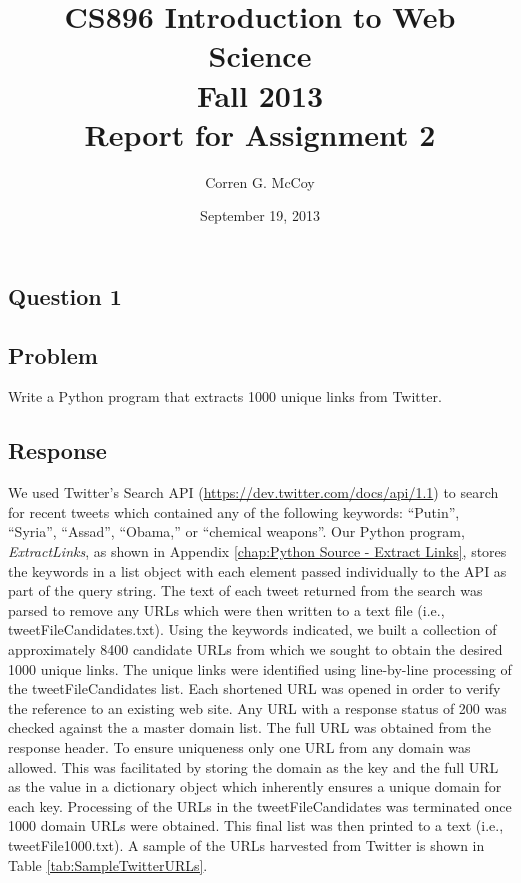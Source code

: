 \documentclass[letterpaper,11pt]{report}
\begin{document}
 
\begin{savenotes}
\pagestyle{plain}
\title{CS896 Introduction to Web Science\\Fall 2013\\Report for Assignment 2}
\author{Corren G. McCoy}
 
\date{September 19, 2013}
\maketitle

\renewcommand*\thesection{\arabic{section}}
\setcounter{section}{0}

\setcounter{tocdepth}{4}
\tableofcontents
 \listoffigures
 \listoftables
\newpage


\section{Question 1}
\subsection{Problem}Write a Python program that extracts 1000 unique links from Twitter.
\subsection{Response}We used Twitter's Search API (\url{https://dev.twitter.com/docs/api/1.1}) to search for recent tweets which contained any of the following keywords: ``Putin'', ``Syria'', ``Assad'', ``Obama,'' or ``chemical weapons''. Our Python program, \emph{ExtractLinks}, as shown in Appendix \ref{chap:Python Source - Extract Links}, stores the keywords in a list object with each element passed individually to the API as part of the query string. The text of each tweet returned from the search was parsed to remove any URLs which were then written to a text file (i.e., tweetFileCandidates.txt). Using the keywords indicated, we built a collection of approximately 8400 candidate URLs from which we sought to obtain the desired 1000 unique links. The unique links were identified using line-by-line processing of the tweetFileCandidates list. Each shortened URL was opened in order to verify the reference to an existing web site. Any URL with a response status of 200 was checked against the a master domain list. The full URL was obtained from the response header. To ensure uniqueness only one URL from any domain was allowed. This was facilitated by storing the domain as the key and the full URL as the value in a dictionary object which inherently ensures a unique domain for each key. Processing of the URLs in the tweetFileCandidates was terminated once 1000 domain URLs were obtained. This final list was then printed to a text (i.e., tweetFile1000.txt). A sample of the URLs harvested from Twitter is shown in Table \ref{tab:SampleTwitterURLs}.


\end{savenotes}
\end{document}
